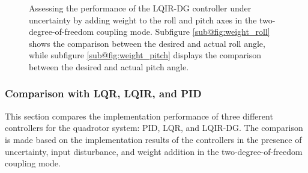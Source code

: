 \documentclass[3p,times]{elsarticle}
\begin{document}
\begin{figure}[H]
	\centering
	\caption{Assessing the performance of the LQIR-DG controller under uncertainty by adding weight to the roll and pitch axes in the two-degree-of-freedom coupling mode. Subfigure \ref{sub@fig:weight_roll} shows the comparison between the desired and actual roll angle, while subfigure \ref{sub@fig:weight_pitch} displays the comparison between the desired and actual pitch angle.}
	\label{fig:weight}
\end{figure}

\subsubsection{Comparison with LQR, LQIR, and PID}
\noindent This section compares the implementation performance of three different controllers for the quadrotor system: PID, LQR, and LQIR-DG. The comparison is made based on the implementation results of the controllers in the presence of uncertainty, input disturbance, and weight addition in the two-degree-of-freedom coupling mode.
\end{document}
